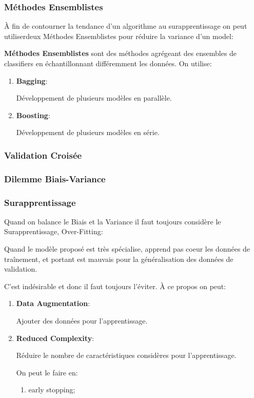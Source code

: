 \documentclass{article}
\begin{document}
\subsubsection{Méthodes Ensemblistes}
À fin de contourner la tendance d'un algorithme au surapprentissage on peut utiliserdeux Méthodes Ensemblistes pour réduire la variance d'un model:
\begin{definition}
    \textbf{Méthodes Ensemblistes} sont des méthodes agrégeant des ensembles de classifiers en échantillonnant différemment les données. On utilise:
    \begin{enumerate}[noitemsep, rightmargin = \leftmargin]
        \item \textbf{Bagging}:
        \begin{definition}
            Développement de plusieurs modèles en parallèle.
        \end{definition}
        \item \textbf{Boosting}:
        \begin{definition}
            Développement de plusieurs modèles en série.
        \end{definition}
    \end{enumerate} 
\end{definition}  

\subsubsection{Validation Croisée}
\subsubsection{Dilemme Biais-Variance}

\subsubsection{Surapprentissage}
Quand on balance le Biais et la Variance il faut toujours considère le Surapprentissage, Over-Fitting:
\begin{definition}
    Quand le modèle proposé est très spécialise, apprend pas coeur les données de traînement, et portant est mauvais pour la généralisation des données de validation.
\end{definition}
C'est indésirable et donc il faut toujours l'éviter. À ce propos on peut:
\begin{enumerate}[noitemsep, rightmargin = \leftmargin]
    \item \textbf{Data Augmentation}:
    \begin{definition}
        Ajouter des données pour l'apprentissage.
    \end{definition}
    \item \textbf{Reduced Complexity}:
    \begin{definition}
        Réduire le nombre de caractéristiques considères pour l'apprentissage.
    \end{definition}
    On peut le faire en:
    \begin{enumerate}[noitemsep]
        \item early stopping;
    \end{enumerate}
\end{enumerate}
\end{document}
